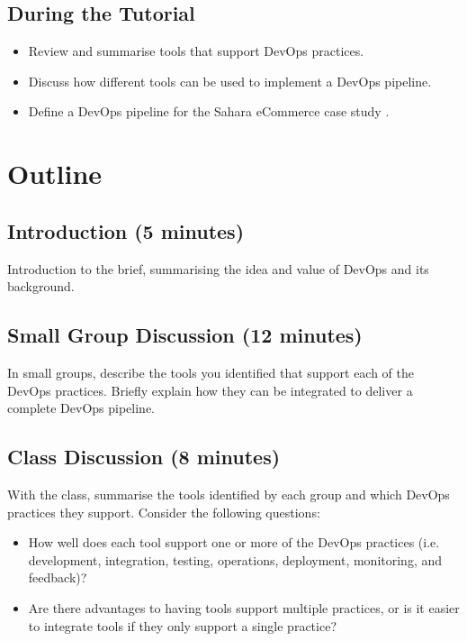 \documentclass{csse4400}
\begin{document}
\subsection*{During the Tutorial}
\begin{itemize}
    \item Review and summarise tools that support DevOps practices.
    \item Discuss how different tools can be used to implement a DevOps pipeline.
    \item Define a DevOps pipeline for the Sahara eCommerce case study \cite{service-based-slides}.
\end{itemize}


\section{Outline}

\subsection*{Introduction (5 minutes)}
Introduction to the brief, summarising the idea and value of DevOps and its background.


\subsection*{Small Group Discussion (12 minutes)}
In small groups, describe the tools you identified that support each of the DevOps practices.
Briefly explain how they can be integrated to deliver a complete DevOps pipeline.


\subsection*{Class Discussion (8 minutes)}
With the class, summarise the tools identified by each group and which DevOps practices they support.
Consider the following questions:
\begin{itemize}
    \item How well does each tool support one or more of the DevOps practices
          (i.e. development, integration, testing, operations, deployment, monitoring, and feedback)?
    \item Are there advantages to having tools support multiple practices,
          or is it easier to integrate tools if they only support a single practice?
\end{itemize}
\end{document}
